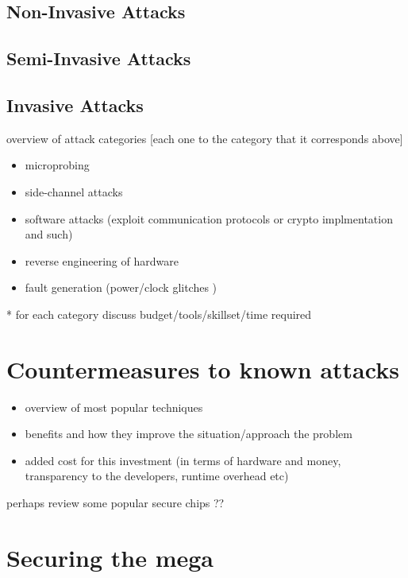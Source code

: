 \documentclass[12pt,a4paper,twocolumn]{article}
\begin{document}
	\subsection{Non-Invasive Attacks}
	\subsection{Semi-Invasive Attacks}
	\subsection{Invasive Attacks}

	overview of attack categories [each one to the category that it corresponds above]
	\begin{itemize}
		\item microprobing \\
		\item side-channel attacks \\
		\item software attacks (exploit communication protocols or crypto implmentation and such) \\
		\item reverse engineering of hardware\\
		\item fault generation (power/clock glitches ) \\
	\end{itemize}
	
	* for each category discuss budget/tools/skillset/time required\\

	\section{Countermeasures to known attacks}
	\begin{itemize}
	\item overview of most popular techniques \\
	\item benefits and how they improve the situation/approach the problem
	\item added cost for this investment (in terms of hardware and money, transparency to the developers, runtime overhead etc)\\
	\end{itemize}
	
	perhaps review some popular secure chips ??	
	
	
	\section{Securing the mega}
\end{document}
